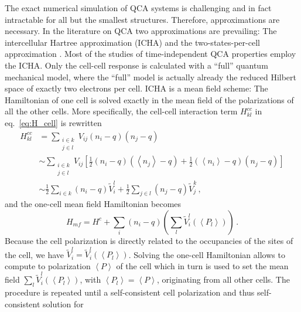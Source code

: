 The exact numerical simulation of QCA systems is challenging and in fact
intractable for all but the smallest structures. Therefore, approximations are
necessary. In the literature on QCA two approximations are prevailing: The
intercellular Hartree approximation (ICHA) and the two-states-per-cell
approximation \cite{lent1993quantum} \cite{tougaw1996dynamic}. Most of the
studies of time-independent QCA properties employ the ICHA. Only the cell-cell
response is calculated with a ``full'' quantum mechanical model, where the
``full'' model is actually already the reduced Hilbert space of exactly two
electrons per cell. ICHA is a mean field scheme: The Hamiltonian of one cell is
solved exactly in the mean field of the polarizations of all the other cells.
More specifically, the cell-cell interaction term $H^{cc}_{kl}$ in
eq.~\eqref{eq:H_cell} is rewritten
\begin{equation}
\begin{split}
  \label{eq:H_kl_meanfield}
  H^{cc}_{kl} 
  &=
  \sum_{\substack{i \in k\\j \in l}} V_{ij} \left( n_i - q \right) \left( n_j - q \right) \\
  &\sim
  \sum_{\substack{i \in k\\j \in l}} V_{ij} 
       \left[ \frac{1}{2} 
              \left( n_i - q \right) \left( \left< n_j \right> - q \right)
              +
              \frac{1}{2}
              \left( \left< n_i \right> - q \right) \left( n_j - q \right)
       \right] \\
  &\sim
  \frac{1}{2} \sum_{i \in k} \left( n_i - q \right) \tilde{V}_i^l
       +
       \frac{1}{2} \sum_{j \in l} \left( n_j - q \right) \tilde{V}_j^k \, ,
\end{split}
\end{equation}
and the one-cell mean field Hamiltonian becomes
\begin{equation}
  \label{eq:H_meanfield}
  H_{mf} = H^c + \sum_i \left( n_i - q \right) \left( \sum_l \tilde{V}_i^l(\left<P_l\right>) \right) \, .
\end{equation}
Because the cell polarization is directly related to the occupancies of the
sites of the cell, we have $\tilde{V}_i^l = \tilde{V}_i^l(\left<P_l\right>)$.
Solving the one-cell Hamiltonian allows to compute to polarization $\left< P
\right>$ of the cell which in turn is used to set the mean field $\sum_l
\tilde{V}_i^l(\left<P_l\right>)$, with $\left<P_l\right> = \left<P\right>$,
originating from all other cells. The procedure is repeated until a
self-consistent cell polarization and thus self-consistent solution for
